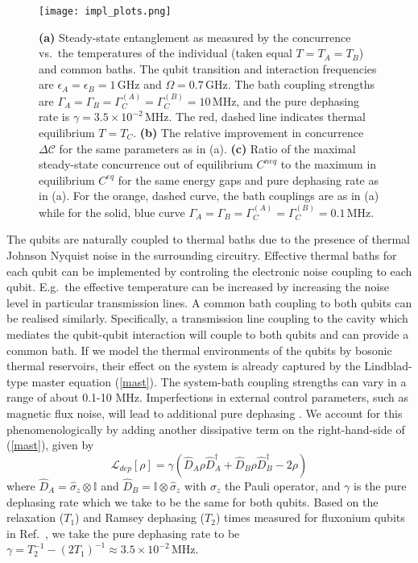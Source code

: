 \documentclass[12pt]{iopart}
\begin{document}
\begin{figure*}[tbp]
\texttt{[image: impl\_plots.png]}
\caption{\textbf{(a)} Steady-state entanglement as measured by the concurrence vs.~the temperatures of the individual (taken equal $T=T_A=T_B$) and common baths. The qubit transition and interaction frequencies are $\epsilon_A=\epsilon_B=1\,\mathrm{GHz}$ and $\Omega=0.7\,\mathrm{GHz}$. The bath coupling strengths are $\Gamma_A=\Gamma_B=\Gamma_C^{(A)}=\Gamma_C^{(B)}=10\,\mathrm{MHz}$, and the pure dephasing rate is $\gamma = 3.5\times 10^{-2}\,\mathrm{MHz}$. The red, dashed line indicates thermal equilibrium $T=T_C$. \textbf{(b)} The relative improvement in concurrence $\Delta\mathcal{C}$ for the same parameters as in (a). \textbf{(c)} Ratio of the maximal steady-state concurrence out of equilibrium $C^{neq}$ to the maximum in equilibrium $C^{eq}$ for the same energy gaps and pure dephasing rate as in (a). For the orange, dashed curve, the bath couplings are as in (a) while for the solid, blue curve $\Gamma_A=\Gamma_B=\Gamma_C^{(A)}=\Gamma_C^{(B)}=0.1\,\mathrm{MHz}$.}
\label{fig.implplots}
\end{figure*}

The qubits are naturally coupled to thermal baths due to the presence of thermal Johnson Nyquist noise in the surrounding circuitry. Effective thermal baths for each qubit can be implemented by controling the electronic noise coupling to each qubit. E.g.~the effective temperature can be increased by increasing the noise level in particular transmission lines. A common bath coupling to both qubits can be realised similarly. Specifically, a transmission line coupling to the cavity which mediates the qubit-qubit interaction will couple to both qubits and can provide a common bath. If we model the thermal environments of the qubits by bosonic thermal reservoirs, their effect on the system is already captured by the Lindblad-type master equation (\ref{mast}). The system-bath coupling strengths can vary in a range of about 0.1-10 MHz. Imperfections in external control parameters, such as magnetic flux noise, will lead to additional pure dephasing \cite{OMalley2016}. We account for this phenomenologically by adding another dissipative term on the right-hand-side of (\ref{mast}), given by
\begin{equation}
\mathcal{L}_{dep}[\rho] = \gamma( \hat{D}_A \rho \hat{D}_A^\dagger + \hat{D}_B \rho \hat{D}_B^\dagger - 2\rho)
\end{equation}
where $\hat{D}_A = \hat{\sigma}_z\otimes\mathbb{I}$ and $\hat{D}_B = \mathbb{I}\otimes\hat{\sigma}_z$ with $\hat{\sigma}_z$ the Pauli operator, and $\gamma$ is the pure dephasing rate which we take to be the same for both qubits. Based on the relaxation ($T_1$) and Ramsey dephasing ($T_2$) times measured for fluxonium qubits in Ref.~\cite{Kou2017}, we take the pure dephasing rate to be $\gamma = T_2^{-1} - (2T_1)^{-1} \approx 3.5\times 10^{-2} \,\mathrm{MHz}$.
\end{document}
